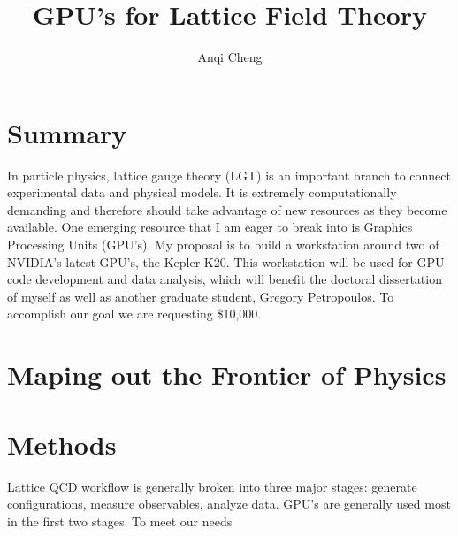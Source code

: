\documentclass[11pt]{article}
\begin{document}
  \title{GPU's for Lattice Field Theory}
  \author{Anqi Cheng}
  \maketitle

  \section*{Summary} %
  In particle physics, lattice gauge theory (LGT) is an important branch to connect experimental data and physical models.
  It is extremely computationally demanding and therefore should take advantage of new  resources as they become available.
  One emerging resource that I am eager to break into is Graphics Processing Units (GPU's).   
  My proposal is to build a workstation around two of NVIDIA's latest GPU's, the Kepler K20.  
  This workstation will be used for GPU code development and data analysis, which will benefit the doctoral dissertation of myself as well as another graduate student, Gregory Petropoulos.  
  To accomplish our goal we are requesting \$10,000.  
 
  \section*{Maping out the Frontier of Physics} %

  \section*{Methods} %
  Lattice QCD workflow is generally broken into three major stages:  generate configurations, measure observables, analyze data.
  GPU's are generally used most in the first two stages.  
  To meet our needs
  
\end{document}
